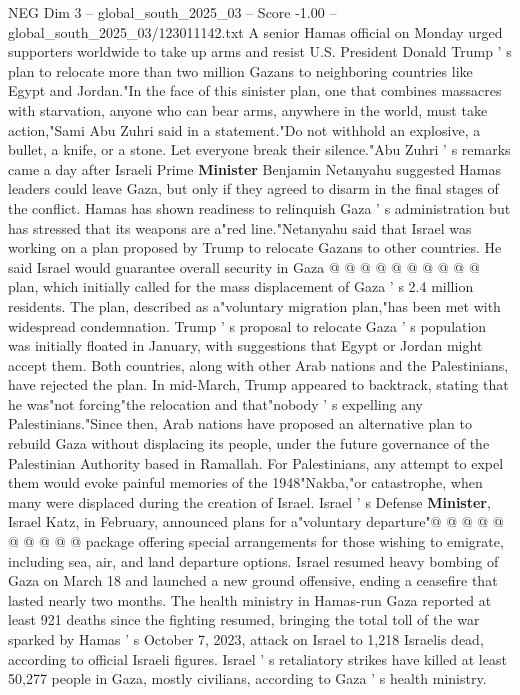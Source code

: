 \begin{textsample}{NEG Dim 3 – global\_south\_2025\_03 – Score -1.00 – global\_south\_2025\_03/123011142.txt}  \label{ex:f3_neg_420}
A senior Hamas official on Monday urged supporters worldwide to take up arms and resist U.S.
President Donald Trump ' s plan to relocate more than two million Gazans to neighboring countries like Egypt and Jordan."In the face of this sinister plan, one that combines massacres with starvation, anyone who can bear arms, anywhere in the world, must take action,"Sami Abu Zuhri said in a statement."Do not withhold an explosive, a bullet, a knife, or a stone.
Let everyone break their silence."Abu Zuhri ' s remarks came a day after Israeli Prime \textbf{Minister} Benjamin Netanyahu suggested Hamas leaders could leave Gaza, but only if they agreed to disarm in the final stages of the conflict.
Hamas has shown readiness to relinquish Gaza ' s administration but has stressed that its weapons are a"red line."Netanyahu said that Israel was working on a plan proposed by Trump to relocate Gazans to other countries.
He said Israel would guarantee overall security in Gaza @ @ @ @ @ @ @ @ @ @ plan, which initially called for the mass displacement of Gaza ' s 2.4 million residents.
The plan, described as a"voluntary migration plan,"has been met with widespread condemnation.
Trump ' s proposal to relocate Gaza ' s population was initially floated in January, with suggestions that Egypt or Jordan might accept them.
Both countries, along with other Arab nations and the Palestinians, have rejected the plan.
In mid-March, Trump appeared to backtrack, stating that he was"not forcing"the relocation and that"nobody ' s expelling any Palestinians."Since then, Arab nations have proposed an alternative plan to rebuild Gaza without displacing its people, under the future governance of the Palestinian Authority based in Ramallah.
For Palestinians, any attempt to expel them would evoke painful memories of the 1948"Nakba,"or catastrophe, when many were displaced during the creation of Israel.
Israel ' s Defense \textbf{Minister}, Israel Katz, in February, announced plans for a"voluntary departure"@ @ @ @ @ @ @ @ @ @ package offering special arrangements for those wishing to emigrate, including sea, air, and land departure options.
Israel resumed heavy bombing of Gaza on March 18 and launched a new ground offensive, ending a ceasefire that lasted nearly two months.
The health ministry in Hamas-run Gaza reported at least 921 deaths since the fighting resumed, bringing the total toll of the war sparked by Hamas ' s October 7, 2023, attack on Israel to 1,218 Israelis dead, according to official Israeli figures.
Israel ' s retaliatory strikes have killed at least 50,277 people in Gaza, mostly civilians, according to Gaza ' s health ministry.

\end{textsample}
